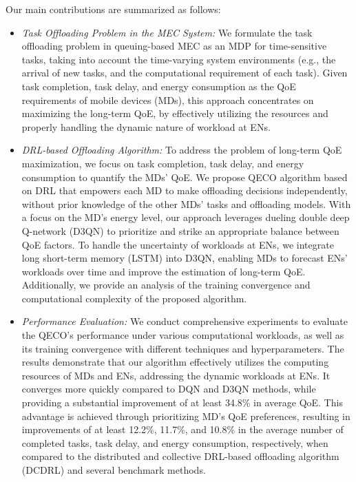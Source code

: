 \documentclass[12pt,draftclsnofoot,onecolumn]{IEEEtran}
\newenvironment{my}[2]%
{\begin{list}{}%
{\setlength{\rightmargin}{#1}\setlength{\leftmargin}{#2}}%


 \item[]{}

} {\end{list}}
\begin{document}
\begin{enumerate}
\begin{my}{1cm}{1cm}
{{Our main contributions are summarized as follows:

\begin{itemize}
	\item \textit{Task Offloading Problem in the MEC System:} We formulate the task offloading problem in queuing-based MEC as an MDP for time-sensitive tasks, taking into account the time-varying system environments (e.g., the arrival of new tasks, and the computational requirement of each task). Given task completion, task delay, and energy consumption as the QoE requirements of mobile devices (MDs), this approach concentrates on maximizing the long-term QoE, by effectively utilizing the resources and properly handling the dynamic nature of workload at ENs. \vspace{2mm}
	
	
	\item \textit{DRL-based Offloading Algorithm:} To address the problem of long-term QoE maximization, we focus on task completion, task delay, and energy consumption to quantify the MDs' QoE. We propose QECO algorithm based on DRL that empowers each MD to make offloading decisions independently, without prior knowledge of the other MDs' tasks and offloading models. With a focus on the MD's energy level, our approach leverages dueling double deep Q-network (D3QN) \cite{wang2016dueling} to prioritize and strike an appropriate balance between QoE factors. To handle the uncertainty of workloads at ENs, we integrate long short-term memory (LSTM) \cite{hochreiter1997long} into D3QN, enabling MDs to forecast ENs' workloads over time and improve the estimation of long-term QoE. Additionally, we provide an analysis of the training convergence and computational complexity of the proposed algorithm. \vspace{2mm}
	
	
\item \textit{Performance Evaluation:} We conduct comprehensive experiments to evaluate the QECO's performance under various computational workloads, as well as its training convergence with different techniques and hyperparameters. The results demonstrate that our algorithm effectively utilizes the computing resources of MDs and ENs, addressing the dynamic workloads at ENs. It converges more quickly compared to DQN and D3QN methods, while providing a substantial improvement of at least 34.8\% in average QoE. This advantage is achieved through prioritizing MD's QoE preferences, resulting in improvements of at least 12.2\%, 11.7\%, and 10.8\% in the average number of completed tasks, task delay, and energy consumption, respectively, when compared to the distributed and collective DRL-based offloading algorithm (DCDRL) \cite{qiu2020distributed} and several benchmark methods.
	

\end{itemize}}}
\end{my}
\end{enumerate}
\end{document}
